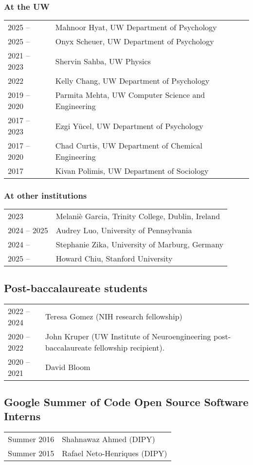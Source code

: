 \documentclass[11pt,fullpage]{article}
\begin{document}
\subsubsection*{At the UW}
\begin{tabular}{p{}p{}}
2025 -- & Mahnoor Hyat, UW Department of Psychology \\
2025 -- & Onyx Scheuer, UW Department of Psychology \\
2021 -- 2023 & Shervin Sahba, UW Physics \\
2022 & Kelly Chang, UW Department of Psychology\\
2019 -- 2020 & Parmita Mehta, UW Computer Science and Engineering\\
2017 -- 2023 & Ezgi Y\"{u}cel, UW Department of Psychology \\
2017 -- 2020 & Chad Curtis, UW Department of Chemical Engineering\\
2017 & Kivan Polimis, UW Department of Sociology
\end{tabular}
\subsubsection*{At other institutions}
\begin{tabular}{p{}p{}}
2023 & Melani\`{e} Garcia, Trinity College, Dublin, Ireland\\
2024 -- 2025 & Audrey Luo, University of Pennsylvania\\
2024 -- & Stephanie Zika, University of Marburg, Germany\\
2025 -- & Howard Chiu, Stanford University \\
\end{tabular}

\subsection*{Post-baccalaureate students}
\begin{tabular}{p{}p{}}
2022 -- 2024 & Teresa Gomez (NIH research fellowship) \\
2020 -- 2022 & John Kruper (UW Institute of Neuroengineering post-baccalaureate fellowship recipient).\\
2020 -- 2021 & David Bloom\\
\end{tabular}

\subsection*{Google Summer of Code Open Source Software Interns}
\begin{tabular}{p{}p{}}
Summer 2016 & Shahnawaz Ahmed (DIPY)\\
Summer 2015 & Rafael Neto-Henriques (DIPY)\\
\end{tabular}
\end{document}
